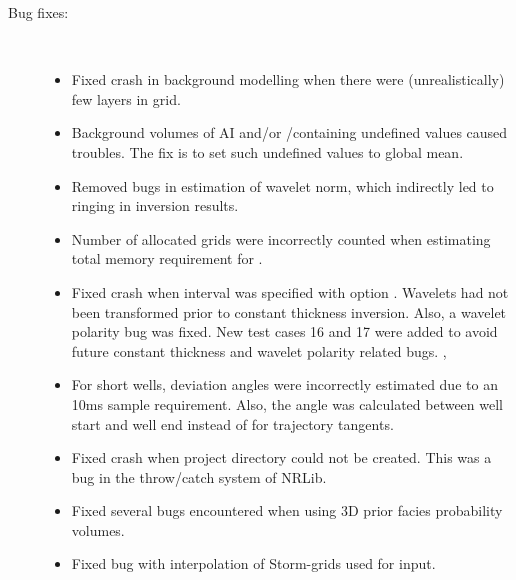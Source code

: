 \begin{description}
\item [Bug fixes:] \mbox{ }
  \begin{itemize}
    \item Fixed crash in background modelling when there were
      (unrealistically) few layers in grid. 
    \item Background volumes of AI and\!/\!or \vp/\vs containing undefined
      values caused troubles. The fix is to set such undefined values
      to global mean. 
    \item Removed bugs in estimation of wavelet norm, which indirectly
      led to ringing in inversion results. 
    \item Number of allocated grids were incorrectly counted when
      estimating total memory requirement for \crava. 
    \item Fixed crash when interval was specified with option
      . Wavelets had not been transformed
      prior to constant thickness inversion. Also, a wavelet polarity
      bug was fixed. New test cases 16 and 17 were added to avoid
      future constant thickness and wavelet polarity related
      bugs. , 
    \item For short wells, deviation angles were incorrectly estimated
      due to an 10ms sample requirement. Also, the angle was
      calculated between well start and well end instead of for
      trajectory tangents.
    \item Fixed crash when project directory could not be
      created. This was a bug in the throw/catch system of
      NRLib. 
    \item Fixed several bugs encountered when using 3D prior facies
      probability volumes. 
    \item Fixed bug with interpolation of Storm-grids used for input.
 \end{itemize}
\end{description}
